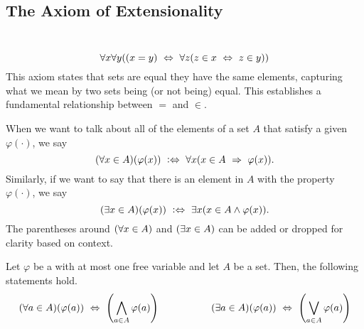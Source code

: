 \subsection{The Axiom of Extensionality}
\begin{axiom}[Extensionality]\label{ax:extensionality}
    ~\vspace{-\baselineskip}
    \[
        \forall x \forall y \pn*{\pn*{x = y} \iff \forall z \pn*{z \in x \iff z \in y}}
    \]
    This axiom states that sets are equal \ifandonlyif they have the same elements,
    capturing what we mean by two sets being (or not being) equal.
    This establishes a fundamental relationship between $=$ and $\in$.
\end{axiom}

\begin{definition}
    When we want to talk about all of the elements of a set $A$ that satisfy a given {\wff} $\varphi(\cdot)$,
    we say
    \[
        \pn*{\forall x \in A}\pn*{\varphi(x)} \iffdefn \forall x \pn*{x \in A \implies \varphi(x)}.
    \]
    Similarly, if we want to say that there is an element in $A$ with the property $\varphi(\cdot)$,
    we say
    \[
        \pn*{\exists x \in A}\pn*{\varphi(x)} \iffdefn \exists x \pn*{x \in A \meet \varphi(x)}.
    \]
    The parentheses around $\pn*{\forall x \in A}$ and $\pn*{\exists x \in A}$
    can be added or dropped for clarity based on context.
\end{definition}

\begin{theorem}
    Let $\varphi$ be a {\wff} with at most one free variable and let $A$ be a set.
    Then, the following statements hold.
    \[
        \pn*{\forall a \in A}\pn*{\varphi(a)} \iff \pn*{\bigmeet_{a \in A}\varphi(a)}
        ~~~~~~~~~~~~~~~~
        \pn*{\exists a \in A}\pn*{\varphi(a)} \iff \pn*{\bigjoin_{a \in A}\varphi(a)}
    \]
\end{theorem}
% 

